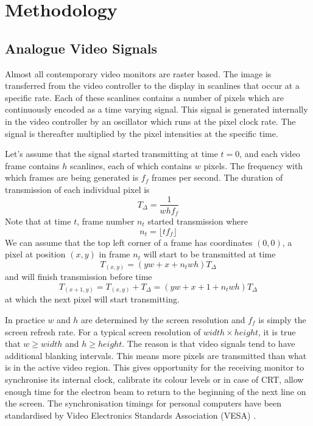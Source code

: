 \documentclass[a4paper,12pt,twoside,openright]{report}
\begin{document}
\chapter{Methodology} 

\section{Analogue Video Signals}

Almost all contemporary video monitors are raster based. The image is transferred from the video controller to the display in scanlines that occur at a specific rate. Each of these scanlines contains a number of pixels which are continuously encoded as a time varying signal. This signal is generated internally in the video controller by an oscillator which runs at the pixel clock rate. The signal is thereafter multiplied by the pixel intensities at the specific time.

Let's assume that the signal started transmitting at time $t=0$, and each video frame contains $h$ scanlines, each of which contains $w$ pixels. The frequency with which frames are being generated is $f_{f}$ frames per second. The duration of transmission of each individual pixel is \begin{equation}
\label{eq:tdelta_definition}
T_{\Delta}=\frac{1}{w h f_{f}}
\end{equation}
Note that at time $t$, frame number $n_{t}$ started transmission where 
\begin{equation}
n_{t}=\lfloor t f_{f} \rfloor
\end{equation}
We can assume that the top left corner of a frame has coordinates $(0, 0)$, a pixel at position $(x, y)$ in frame $n_{t}$ will start to be transmitted at time
\begin{equation}
T_{(x,y)}= (y w + x + n_{t} w h) T_{\Delta}
\end{equation}
and will finish transmission before time 
\begin{equation}
T_{(x+1,y)} = T_{(x,y)} + T_{\Delta} =(y w + x + 1 + n_{t} w h) T_{\Delta}
\end{equation}
at which the next pixel will start transmitting.

In practice $w$ and $h$ are determined by the screen resolution and $f_{f}$ is simply the screen refresh rate. For a typical screen resolution of $width \times height$, it is true that $w \geq width$ and $h \geq height$. The reason is that video signals tend to have additional blanking intervals. This means more pixels are transmitted than what is in the active video region. This gives opportunity for the receiving monitor to synchronise its internal clock, calibrate its colour levels or in case of CRT, allow enough time for the electron beam to return to the beginning of the next line on the screen. The synchronisation timings for personal computers have been standardised by Video Electronics Standards Association (VESA) \cite{vesa}.
\end{document}
